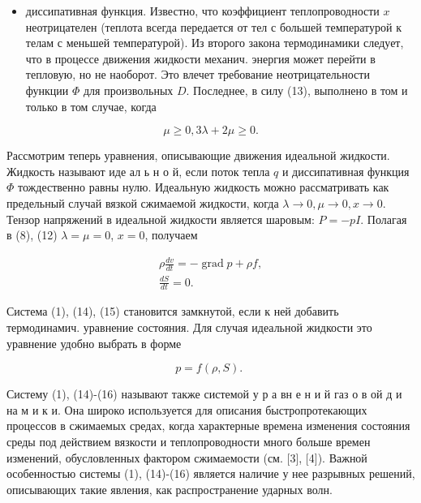 \documentclass[10pt]{article}
\begin{document}
\begin{itemize}

  \item диссипативная функция. Известно, что коэффициент теплопроводности $x$ неотрицателен (теплота всегда передается от тел с большей температурой к телам с меньшей температурой). Из второго закона термодинамики следует, что в процессе движения жидкости механич. энергия может перейти в тепловую, но не наоборот. Это влечет требование неотрицательности функции $\Phi$ для произвольных $D$. Последнее, в силу (13), выполнено в том и только в том случае, когда

\end{itemize}



\[

\mu \geqslant 0,3 \lambda+2 \mu \geqslant 0 .

\]



Рассмотрим теперь уравнения, описывающие движения идеальной жидкости. Жидкость называют иде ал ь н о й, если поток тепла $q$ и диссипативная функция $\Phi$ тождественно равны нулю. Идеальную жидкость можно рассматривать как предельный случай вязкой сжимаемой жидкости, когда $\lambda \rightarrow 0, \mu \rightarrow 0, x \rightarrow 0$. Тензор напряжений в идеальной жидкости является шаровым: $P=-p I$. Полагая в (8), (12) $\lambda=\mu=0$, $x=0$, получаем



\[

\begin{gathered}

\rho \frac{d v}{d t}=-\operatorname{grad} p+\rho f, \\

\frac{d S}{d t}=0 .

\end{gathered}

\]



Система (1), (14), (15) становится замкнутой, если к ней добавить термодинамич. уравнение состояния. Для случая идеальной жидкости это уравнение удобно выбрать в форме



\[

p=f(\rho, S) \text {. }

\]



Систему (1), (14)-(16) называют также системой у р а вн е н и й газ о в ой д и на м и к и. Она широко используется для описания быстропротекающих процессов в сжимаемых средах, когда характерные времена изменения состояния среды под действием вязкости и теплопроводности много больше времен изменений, обусловленных фактором сжимаемости (см. [3], [4]). Важной особенностью системы (1), (14)-(16) является наличие у нее разрывных решений, описывающих такие явления, как распространение ударных волн.
\end{document}
